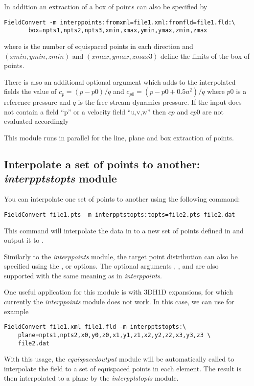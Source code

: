 In addition an extraction of a box of points can also be specified by
\begin{lstlisting}[style=BashInputStyle]
  FieldConvert -m interppoints:fromxml=file1.xml:fromfld=file1.fld:\
       box=npts1,npts2,npts3,xmin,xmax,ymin,ymax,zmin,zmax
\end{lstlisting}
where  is the number of equispaced points in each
direction and $(xmin,ymin,zmin)$ and $(xmax,ymax,zmax3)$
define the limits of the box of points.

There is also an additional optional argument  which adds to the
interpolated fields the value of $c_p=(p-p0)/q$ and $c_{p0}=(p-p0+0.5 u^2)/q$
where $p0$ is a reference pressure and $q$ is the free stream dynamics pressure.
If the input does not contain a field ``p'' or a velocity field ``u,v,w'' then $cp$
and $cp0$ are not evaluated accordingly
%
\begin{notebox}
This module  runs in parallel for the line, plane and box extraction of points.
\end{notebox}
%
%
%
\subsection{Interpolate a set of points to another: \textit{interpptstopts} module}
You can interpolate one set of points to another using the following command:
\begin{lstlisting}[style=BashInputStyle]
FieldConvert file1.pts -m interpptstopts:topts=file2.pts file2.dat
\end{lstlisting}
This command will interpolate the data in   to a new set
of points defined in \inltt{file2.pts} and output it to
.

Similarly to the \textit{interppoints} module, the target point distribution
can also be specified using the \inltt{line}, \inltt{plane} or \inltt{box}
options. The optional arguments \inltt{clamptolowervalue},
,  and  are also
supported with the same meaning as in \textit{interppoints}.

One useful application for this module is with 3DH1D expansions, for which
currently the \textit{interppoints} module does not work. In this case, we can
use for example
\begin{lstlisting}[style=BashInputStyle]
FieldConvert file1.xml file1.fld -m interpptstopts:\
    plane=npts1,npts2,x0,y0,z0,x1,y1,z1,x2,y2,z2,x3,y3,z3 \
    file2.dat
\end{lstlisting}
With this usage, the \textit{equispacedoutput} module will be automatically
called to interpolate the field to a set of equispaced points in each element.
The result is then interpolated to a plane by the \textit{interpptstopts} module.

